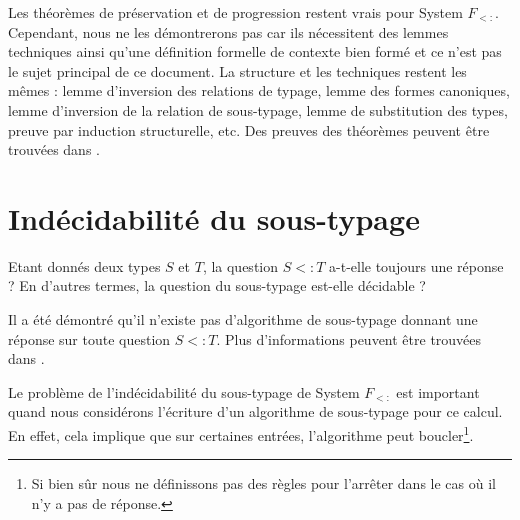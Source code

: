 Les théorèmes de préservation et de progression restent vrais pour System
$F_{<:}$. Cependant, nous ne les démontrerons pas car ils nécessitent des lemmes
techniques ainsi qu'une définition formelle de contexte bien formé et ce n'est
pas le sujet principal de ce document. La structure
et les techniques restent les mêmes : lemme d'inversion des relations de typage,
lemme des formes canoniques, lemme d'inversion de la relation de sous-typage, lemme de
substitution des types, preuve par induction structurelle, etc.
Des preuves des théorèmes peuvent être trouvées dans
\cite{tapl-bounded-quantification}.

\section{Indécidabilité du sous-typage}

Etant donnés deux types $S$ et $T$, la question $S <: T$ a-t-elle
toujours une réponse ? En d'autres termes, la question du sous-typage est-elle
décidable ?

Il a été démontré qu'il n'existe pas d'algorithme de sous-typage donnant une
réponse sur toute question $S <: T$. Plus d'informations peuvent être trouvées
dans \cite{tapl-bounded-quantification-metatheory}.

Le problème de l'indécidabilité du sous-typage de System $F_{<:}$ est important
quand nous considérons l'écriture d'un algorithme de sous-typage pour ce calcul.
En effet, cela implique que sur certaines entrées, l'algorithme peut
boucler\footnote{Si bien sûr nous ne définissons pas des règles pour l'arrêter
  dans le cas où il n'y a pas de réponse.}.